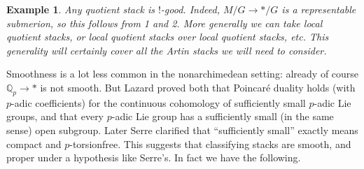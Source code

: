 \documentclass[12pt]{article}
\newtheorem{example}[theorem]{Example}
\begin{document}
\begin{example}\label{lotsaregood}
Any quotient stack is $!$-good.  Indeed, $M/G \to \ast/G$ is a representable submerion, so this follows from 1 and 2.  More generally we can take local quotient stacks, or local quotient stacks over local quotient stacks, etc.  This generality will certainly cover all the Artin stacks we will need to consider.
\end{example}

Smoothness is a lot less common in the nonarchimedean setting: already of course $\mathbb{Q}_p\to \ast$ is not smooth. But Lazard proved both that Poincaré duality holds (with $p$-adic coefficients) for the continuous cohomology of sufficiently small $p$-adic Lie groups, and that every $p$-adic Lie group has a sufficiently small (in the same sense) open subgroup.  Later Serre clarified that ``sufficiently small'' exactly means compact and $p$-torsionfree. This suggests that classifying stacks are smooth, and proper under a hypothesis like Serre's.  In fact we have the following.
\end{document}
